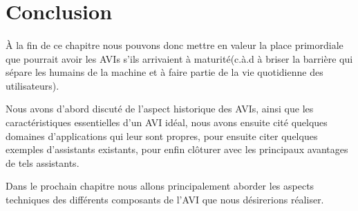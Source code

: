\section{Conclusion}
\paragraph{}
À la fin de ce chapitre nous pouvons donc mettre en valeur la place primordiale que pourrait avoir les AVIs s'ils arrivaient à maturité(c.à.d à briser la barrière qui sépare les humains de la machine et à faire partie de la vie quotidienne des utilisateurs). \par Nous avons d'abord discuté de l'aspect historique des AVIs, ainsi que les caractéristiques essentielles d'un AVI idéal, nous avons ensuite cité quelques domaines d'applications qui leur sont propres, pour ensuite citer quelques exemples d'assistants existants, pour enfin clôturer avec les principaux avantages de tels assistants.
\par Dans le prochain chapitre nous allons principalement aborder les aspects techniques des différents composants de l'AVI que nous désirerions réaliser.

 
